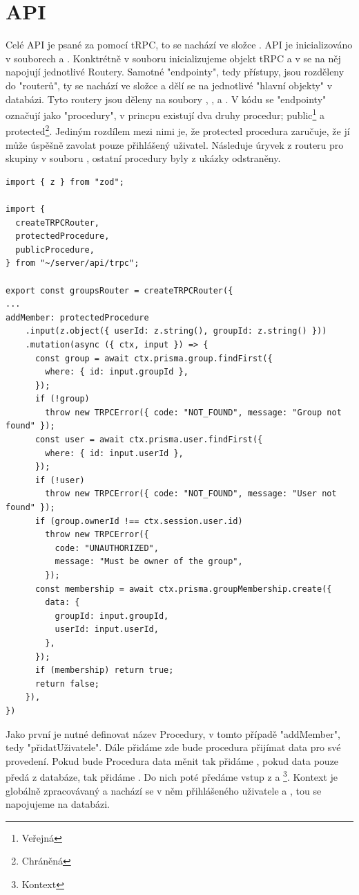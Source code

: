 \section{API}
\label{sec:api}

Celé API je psané za pomocí tRPC, to se nachází ve složce .
API je inicializováno v souborech  a . Konktrétně v souboru  inicializujeme objekt tRPC a v  se na něj napojují jednotlivé Routery. Samotné "endpointy", tedy přístupy, jsou rozděleny do "routerů", ty se nachází ve složce  a dělí se na jednotlivé "hlavní objekty" v databázi. Tyto routery jsou děleny na soubory , ,  a . V kódu se "endpointy" označují jako "procedury", v princpu existují dva druhy procedur; public\footnote{Veřejná} a protected\footnote{Chráněná}. Jediným rozdílem mezi nimi je, že protected procedura zaručuje, že jí může úspěšně zavolat pouze přihlášený uživatel.
Následuje úryvek z routeru pro skupiny v souboru , ostatní procedury byly z ukázky odstraněny.
\begin{lstlisting}[caption={Procedura na přidání uživatele do skupiny}]
import { z } from "zod";

import {
  createTRPCRouter,
  protectedProcedure,
  publicProcedure,
} from "~/server/api/trpc";

export const groupsRouter = createTRPCRouter({
...
addMember: protectedProcedure
    .input(z.object({ userId: z.string(), groupId: z.string() }))
    .mutation(async ({ ctx, input }) => {
      const group = await ctx.prisma.group.findFirst({
        where: { id: input.groupId },
      });
      if (!group)
        throw new TRPCError({ code: "NOT_FOUND", message: "Group not found" });
      const user = await ctx.prisma.user.findFirst({
        where: { id: input.userId },
      });
      if (!user)
        throw new TRPCError({ code: "NOT_FOUND", message: "User not found" });
      if (group.ownerId !== ctx.session.user.id)
        throw new TRPCError({
          code: "UNAUTHORIZED",
          message: "Must be owner of the group",
        });
      const membership = await ctx.prisma.groupMembership.create({
        data: {
          groupId: input.groupId,
          userId: input.userId,
        },
      });
      if (membership) return true;
      return false;
    }),
})
\end{lstlisting}
Jako první je nutné definovat název Procedury, v tomto případě "addMember", tedy "přidatUživatele". Dále přidáme  zde bude procedura přijímat data pro své provedení. Pokud bude Procedura data měnit tak přidáme , pokud data pouze předá z databáze, tak přidáme . Do nich poté předáme vstup z  a \footnote{Kontext}. Kontext je globálně zpracovávaný a nachází se v něm  přihlášeného uživatele a , tou se napojujeme na databázi.
\newpage
